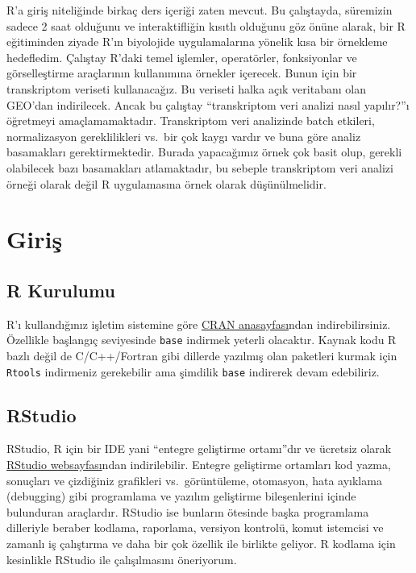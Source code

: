 \documentclass[
]{book}
\begin{document}
R'a giriş niteliğinde birkaç ders içeriği zaten mevcut. Bu çalıştayda, süremizin sadece 2 saat olduğunu ve interaktifliğin kısıtlı olduğunu göz önüne alarak, bir R eğitiminden ziyade R'ın biyolojide uygulamalarına yönelik kısa bir örnekleme hedefledim. Çalıştay R'daki temel işlemler, operatörler, fonksiyonlar ve görselleştirme araçlarının kullanımına örnekler içerecek. Bunun için bir transkriptom veriseti kullanacağız. Bu veriseti halka açık veritabanı olan GEO'dan indirilecek. Ancak bu çalıştay ``transkriptom veri analizi nasıl yapılır?''ı öğretmeyi amaçlamamaktadır. Transkriptom veri analizinde batch etkileri, normalizasyon gereklilikleri vs.~bir çok kaygı vardır ve buna göre analiz basamakları gerektirmektedir. Burada yapacağımız örnek çok basit olup, gerekli olabilecek bazı basamakları atlamaktadır, bu sebeple transkriptom veri analizi örneği olarak değil R uygulamasına örnek olarak düşünülmelidir.

\hypertarget{giriux15f}{%
\chapter{Giriş}\label{giriux15f}}

\hypertarget{r-kurulumu}{%
\section{R Kurulumu}\label{r-kurulumu}}

R'ı kullandığınız işletim sistemine göre \href{https://cran.r-project.org/}{CRAN anasayfası}ndan indirebilirsiniz. Özellikle başlangıç seviyesinde \texttt{base} indirmek yeterli olacaktır. Kaynak kodu R bazlı değil de C/C++/Fortran gibi dillerde yazılmış olan paketleri kurmak için \texttt{Rtools} indirmeniz gerekebilir ama şimdilik \texttt{base} indirerek devam edebiliriz.

\hypertarget{rstudio}{%
\section{RStudio}\label{rstudio}}

RStudio, R için bir IDE yani ``entegre geliştirme ortamı''dır ve ücretsiz olarak \href{https://www.rstudio.com/}{RStudio websayfası}ndan indirilebilir. Entegre geliştirme ortamları kod yazma, sonuçları ve çizdiğiniz grafikleri vs.~görüntüleme, otomasyon, hata ayıklama (debugging) gibi programlama ve yazılım geliştirme bileşenlerini içinde bulunduran araçlardır. RStudio ise bunların ötesinde başka programlama dilleriyle beraber kodlama, raporlama, versiyon kontrolü, komut istemcisi ve zamanlı iş çalıştırma ve daha bir çok özellik ile birlikte geliyor. R kodlama için kesinlikle RStudio ile çalışılmasını öneriyorum.
\end{document}
